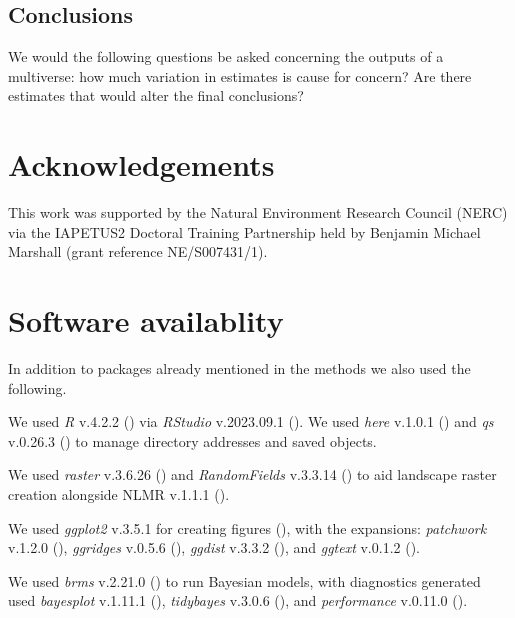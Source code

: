 \documentclass[10pt,a4paper]{article}
\begin{document}
\subsection{Conclusions}\label{conclusions}

We would the following questions be asked concerning the outputs of a multiverse: how much variation in estimates is cause for concern? Are there estimates that would alter the final conclusions?

\section{Acknowledgements}\label{acknowledgements}

This work was supported by the Natural Environment Research Council (NERC) via the IAPETUS2 Doctoral Training Partnership held by Benjamin Michael Marshall (grant reference NE/S007431/1).

\section{Software availablity}\label{software-availablity}

In addition to packages already mentioned in the methods we also used the following.

We used \emph{R} v.4.2.2 () via \emph{RStudio} v.2023.09.1 ().
We used \emph{here} v.1.0.1 () and \emph{qs} v.0.26.3 () to manage directory addresses and saved objects.

We used \emph{raster} v.3.6.26 () and \emph{RandomFields} v.3.3.14 () to aid landscape raster creation alongside NLMR v.1.1.1 ().

We used \emph{ggplot2} v.3.5.1 for creating figures (), with the expansions: \emph{patchwork} v.1.2.0 (), \emph{ggridges} v.0.5.6 (), \emph{ggdist} v.3.3.2 (), and \emph{ggtext} v.0.1.2 ().

We used \emph{brms} v.2.21.0 () to run Bayesian models, with diagnostics generated used \emph{bayesplot} v.1.11.1 (), \emph{tidybayes} v.3.0.6 (), and \emph{performance} v.0.11.0 ().
\end{document}
